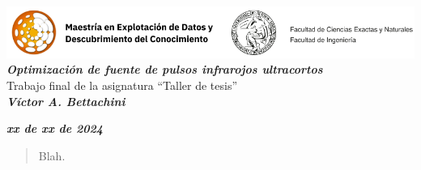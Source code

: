 \documentclass[a4paper,twoside,openright]{report}
\begin{document}
\begin{titlepage}
	\begin{center}
		\includegraphics[width=\textwidth]{logos}\\[1cm]
  \textit{\textbf{Optimización de fuente de pulsos infrarojos ultracortos}}\\
		Trabajo final de la asignatura ``Taller de tesis''\\
		\textit{\textbf{Víctor A. Bettachini}}\\[1cm]
	\end{center}
		\textit{\textbf{xx de xx de 2024}}
\end{titlepage}


\begin{abstract}
	Blah.
\end{abstract}

%
\end{document}
